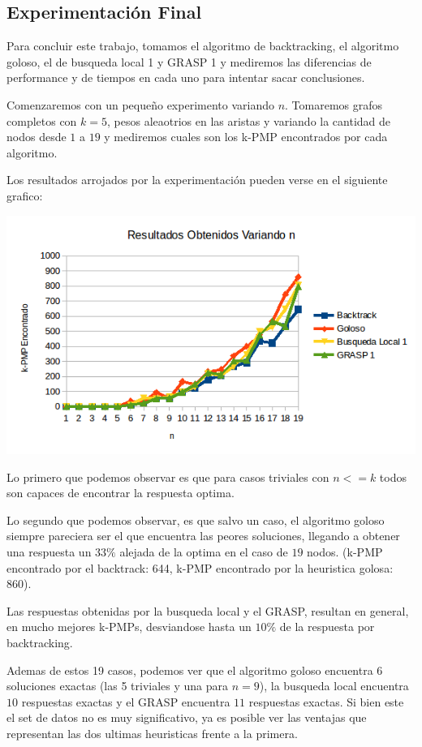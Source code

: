\subsection{Experimentación Final}

Para concluir este trabajo, tomamos el algoritmo de backtracking, el algoritmo goloso, el de busqueda local 1 y GRASP 1 y mediremos las diferencias de performance y de tiempos en cada uno para intentar sacar conclusiones.

Comenzaremos con un pequeño experimento variando $n$. Tomaremos grafos completos con $k = 5$, pesos aleaotrios en las aristas y variando la cantidad de nodos desde $1$ a $19$ y mediremos cuales son los k-PMP encontrados por cada algoritmo.

Los resultados arrojados por la experimentación pueden verse en el siguiente grafico:

\includegraphics[scale=0.5]{Con/performance1.png}

Lo primero que podemos observar es que para casos triviales con $n <= k$ todos son capaces de encontrar la respuesta optima.

Lo segundo que podemos observar, es que salvo un caso, el algoritmo goloso siempre pareciera ser el que encuentra las peores soluciones, llegando a obtener una respuesta un $33 \%$ alejada de la optima en el caso de $19$ nodos. (k-PMP encontrado por el backtrack: 644, k-PMP encontrado por la heuristica golosa: 860).

Las respuestas obtenidas por la busqueda local y el GRASP, resultan en general, en mucho mejores k-PMPs, desviandose hasta un $10\%$ de la respuesta por backtracking.

Ademas de estos 19 casos, podemos ver que el algoritmo goloso encuentra $6$ soluciones exactas (las 5 triviales y una para $n = 9$), la busqueda local encuentra $10$ respuestas exactas y el GRASP encuentra $11$ respuestas exactas. Si bien este el set de datos no es muy significativo, ya es posible ver las ventajas que representan las dos ultimas heuristicas frente a la primera.

